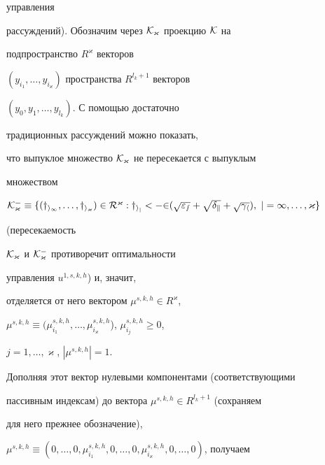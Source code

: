 управления 


рассуждений). Обозначим через $\cal K_\varkappa$ проекцию $\cal K$ на 


подпространство $R^\varkappa$ векторов 


$(y_{i_1},\dotsc,y_{i_\varkappa})$ пространства $R^{l_k+1}$ векторов 


$(y_0,y_1,\dotsc,y_{l_k})$. С помощью достаточно 


традиционных рассуждений можно показать, 


что выпуклое множество $\cal K_\varkappa$ не пересекается с выпуклым 


множеством 


$\cal K^-_\varkappa\equiv\{(y_{i_1},\dotsc,y_{i_\varkappa})\in 


R^\varkappa:y_{i_j}<-2(\sqrt{\varepsilon_s}+ 


\sqrt{\delta_k}+\sqrt{\gamma_h}),\ j=1,\dotsc,\varkappa\}$ 


(пересекаемость 


$\cal K_\varkappa$ и $\cal K^-_\varkappa$ противоречит оптимальности 


управления $u^{1,s,k,h}$) и, значит, 


отделяется от него вектором $\mu^{s,k,h}\in R^\varkappa$, 


$\mu^{s,k,h}\equiv(\mu^{s,k,h}_{i_1},\dotsc, 


\mu^{s,k,h}_{i_\varkappa}$), $\mu^{s,k,h}_{i_j}\ge0$, 


$j=1,\dotsc,\varkappa$, $|\mu^{s,k,h}|=1$. 


Дополняя этот вектор нулевыми компонентами (соответствующими 


пассивным индексам) до вектора $\mu^{s,k,h}\in R^{l_k+1}$ (сохраняем 


для него прежнее обозначение),


$\mu^{s,k,h}\equiv(0,\dotsc,0,\mu^{s,k,h}_{i_1},0,\dotsc,0, 


\mu^{s,k,h}_{i_\varkappa},0,\dotsc,0)$, получаем 


